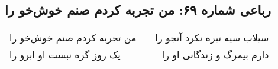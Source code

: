 \begin{center}
\section*{رباعی شماره ۶۹: من تجربه کردم صنم خوش‌خو را}
\label{sec:0069}
\begin{longtable}{l p{0.5cm} r}
من تجربه کردم صنم خوش‌خو را
&&
سیلاب سیه تیره نکرد آنجو را
\\
یک روز گره نبست او ابرو را
&&
دارم بیمرگ و زندگانی او را
\\
\end{longtable}
\end{center}
